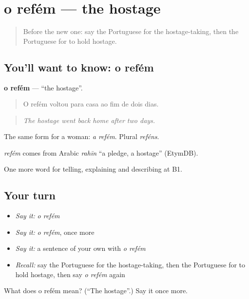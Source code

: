\section[o refém]{o refém — the hostage}

\label{lesson:PT-C291-refem}



\begin{quote}
Before the new one: say the Portuguese for the hostage-taking, then the Portuguese for to hold hostage.
\end{quote}

\subsection*{You'll want to know: o refém}
\textbf{o refém} — \textquotedblleft{}the hostage\textquotedblright{}.

\begin{quote}
O refém voltou para casa ao fim de dois dias.
\end{quote}

\begin{quote}
\emph{The hostage went back home after two days.}
\end{quote}

The same form for a woman: \emph{a refém}. Plural \emph{reféns}.

\begin{cousinweb}
\emph{refém} comes from Arabic \emph{rahīn} \textquotedblleft{}a pledge, a hostage\textquotedblright{} (EtymDB).
\end{cousinweb}

\begin{grammarlens}[title={What you've built}]
One more word for telling, explaining and describing at B1.
\end{grammarlens}

\subsection*{Your turn}
\begin{itemize}
\raggedright
  \item \emph{Say it:} \emph{o refém}
  \item \emph{Say it:} \emph{o refém}, once more
  \item \emph{Say it:} a sentence of your own with \emph{o refém}
  \item \emph{Recall:} say the Portuguese for the hostage-taking, then the Portuguese for to hold hostage, then say \emph{o refém} again
\end{itemize}

\begin{tcolorbox}[breakable,colback=teal!4,colframe=teal!35!black,title={Before you move on}]
What does o refém mean? (\textquotedblleft{}The hostage\textquotedblright{}.) Say it once more.
\end{tcolorbox}
